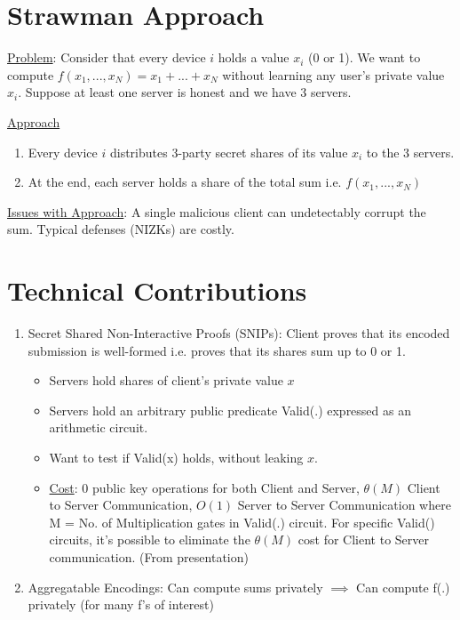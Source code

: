 \section{Strawman Approach}

\underline{Problem}: Consider that every device $i$ holds a value $x_i$ (0 or 1). We want to compute $f(x_1, ..., x_N) = x_1 + ... + x_N$ without learning any user's private value $x_i$. Suppose at least one server is honest and we have 3 servers. 

\noindent \underline{Approach}
\begin{enumerate}
    \item Every device $i$ distributes 3-party secret shares of its value $x_i$ to the 3 servers.
    \item At the end, each server holds a share of the total sum i.e. $f(x_1, ..., x_N)$
\end{enumerate}

\noindent \underline{Issues with Approach}: A single malicious client can undetectably corrupt the sum. Typical defenses (NIZKs) are costly.

\section{Technical Contributions}
\begin{enumerate}
    \item Secret Shared Non-Interactive Proofs (SNIPs): Client proves that its encoded submission is well-formed i.e. proves that its shares sum up to 0 or 1.
    \begin{itemize}
        \item Servers hold shares of client's private value $x$
        \item Servers hold an arbitrary public predicate Valid(.) expressed as an arithmetic circuit.
        \item Want to test if Valid(x) holds, without leaking $x$.
        \item \underline{Cost}: 0 public key operations for both Client and Server, $\theta(M)$ Client to Server Communication, $O(1)$ Server to Server Communication where M = No. of Multiplication gates in Valid(.) circuit. For specific Valid() circuits, it's possible to eliminate the $\theta(M)$ cost for Client to Server communication. (From presentation)
    \end{itemize}
    \item Aggregatable Encodings: Can compute sums privately $\implies$ Can compute f(.) privately (for many f's of interest)
\end{enumerate}


